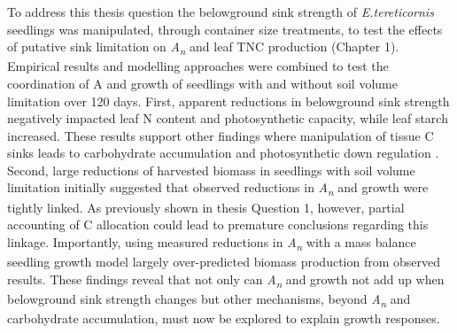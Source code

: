 \documentclass[a4paper]{article}\usepackage[]{graphicx}\usepackage[]{color}
\begin{document}
To address this thesis question the belowground sink strength of \textit{E.tereticornis} seedlings was manipulated, through container size treatments, to test the effects of putative sink limitation on \textit{A\textsubscript{n}} and leaf TNC production (Chapter 1). Empirical results and modelling approaches were combined to test the coordination of A and growth of seedlings with and without soil volume limitation over 120 days. First, apparent reductions in belowground sink strength negatively impacted leaf N content and photosynthetic capacity, while leaf starch increased. These results support other findings where manipulation of tissue C sinks leads to carbohydrate accumulation and photosynthetic down regulation \citep{hoch2002altitudinal, iglesias2002regulation, equiza2006photosynthetic, urban2007girdling;, haouari2013fruit}. Second, large reductions of harvested biomass in seedlings with soil volume limitation initially suggested that observed reductions in \textit{A\textsubscript{n}} and growth were tightly linked. As previously shown in thesis Question 1, however, partial accounting of C allocation could lead to premature conclusions regarding this linkage. Importantly, using measured reductions in \textit{A\textsubscript{n}} with a mass balance seedling growth model largely over-predicted biomass production from observed results. These findings reveal that not only can \textit{A\textsubscript{n}} and growth not add up when belowground sink strength changes but other mechanisms, beyond \textit{A\textsubscript{n}} and carbohydrate accumulation, must now be explored to explain growth responses.
\end{document}
